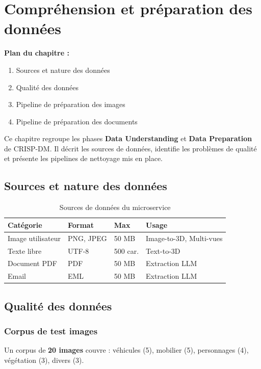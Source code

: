 \documentclass[12pt,a4paper,oneside]{report}
\newcommand{\theadrow}{\rowcolor{tekupblue!12}}
\newcommand{\chapterintro}[2]{%
  \begin{tcolorbox}[colback=tekupblue!4,colframe=tekupblue!40,
    boxrule=0.6pt,arc=4pt,left=10pt,right=10pt,top=6pt,bottom=6pt]
  \small\textbf{Plan du chapitre :}\\[3pt]#1
  \end{tcolorbox}
  \vspace{6pt}\noindent #2\vspace{10pt}
}
\begin{document}
\chapter{Compréhension et préparation des données}

\chapterintro{%
  \begin{enumerate}[noitemsep,leftmargin=*]
    \item Sources et nature des données
    \item Qualité des données
    \item Pipeline de préparation des images
    \item Pipeline de préparation des documents
  \end{enumerate}
}{%
  Ce chapitre regroupe les phases \textbf{Data Understanding} et
  \textbf{Data Preparation} de CRISP-DM. Il décrit les sources de données,
  identifie les problèmes de qualité et présente les pipelines de
  nettoyage mis en place.
}

\section{Sources et nature des données}

\begin{table}[H]
\centering
\caption{Sources de données du microservice}
\label{tab:sources}
\begin{tabularx}{\linewidth}{@{}lllX@{}}
\toprule
\theadrow
\textbf{Catégorie} & \textbf{Format} & \textbf{Max} & \textbf{Usage} \\\midrule
Image utilisateur & PNG, JPEG & 50 MB & Image-to-3D, Multi-vues \\
Texte libre       & UTF-8     & 500 car. & Text-to-3D \\
Document PDF      & PDF       & 50 MB & Extraction LLM \\
Email             & EML       & 50 MB & Extraction LLM \\
\bottomrule
\end{tabularx}
\end{table}

\section{Qualité des données}

\subsection{Corpus de test images}
Un corpus de \textbf{20 images} couvre : véhicules (5), mobilier (5),
personnages (4), végétation (3), divers (3).
\end{document}

